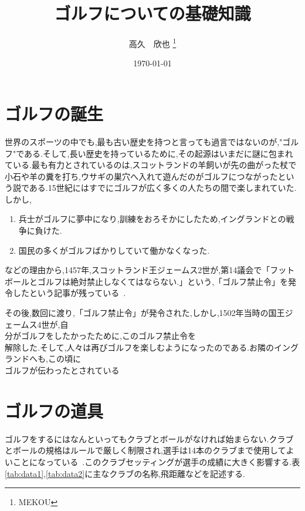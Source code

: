 \documentclass[a4j, twocolumn]{jarticle}
\begin{document}
\title{ゴルフについての基礎知識}
\author{高久　欣也 \thanks{MEKOU}}
\date{\today{}}

\maketitle
\thispagestyle{empty}

\section{ゴルフの誕生}
世界のスポーツの中でも,最も古い歴史を持つと言っても過言ではないのが,"ゴルフ"である.そして,長い歴史を持っているために,その起源はいまだに謎に包まれている.最も有力とされているのは,スコットランドの羊飼いが先の曲がった杖で小石や羊の糞を打ち,ウサギの巣穴へ入れて遊んだのがゴルフにつながったという説である.15世紀にはすでにゴルフが広く多くの人たちの間で楽しまれていた.しかし,

\begin{enumerate}

\item 兵士がゴルフに夢中になり,訓練をおろそかにしたため,イングランドとの戦争に負けた.
\item 国民の多くがゴルフばかりしていて働かなくなった.

\end{enumerate}
などの理由から,1457年,スコットランド王ジェームス2世が,第14議会で「フットボールとゴルフは絶対禁止しなくてはならない.」という,「ゴルフ禁止令」を発令したという記事が残っている~\cite{ref1}.


その後,数回に渡り,「ゴルフ禁止令」が発令された,しかし,1502年当時の国王ジェームス4世が,自 \\
分がゴルフをしたかったために,このゴルフ禁止令を \\
解除した.そして,人々は再びゴルフを楽しむようになったのである.お隣のイングランドへも,この頃に \\ 
ゴルフが伝わったとされている~\cite{ref1}

\section{ゴルフの道具}
ゴルフをするにはなんといってもクラブとボールがなければ始まらない.クラブとボールの規格はルールで厳しく制限され,選手は14本のクラブまで使用してよいことになっている~\cite{ref2}.このクラブセッティングが選手の成績に大きく影響する.表\ref{tab:data1},\ref{tab:data2}に主なクラブの名称,飛距離などを記述する.
\end{document}

